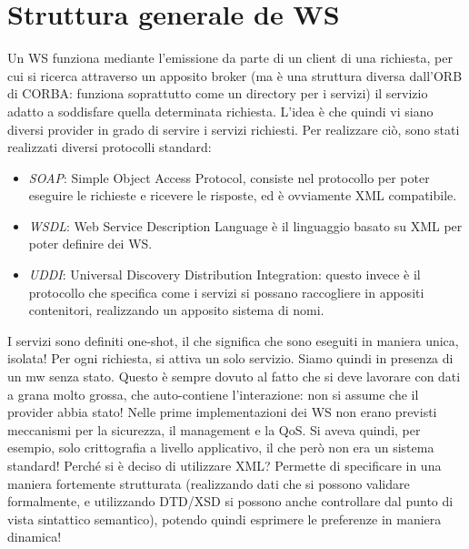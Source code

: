 \section{Struttura generale de WS}
Un WS funziona mediante l'emissione da parte di un client di una richiesta, per cui si ricerca attraverso un apposito
broker (ma è una struttura diversa dall'ORB di CORBA: funziona soprattutto come un directory per i servizi) il
servizio adatto a soddisfare quella determinata richiesta.
L'idea è che quindi vi siano diversi provider in grado di servire i servizi richiesti. Per realizzare ciò, sono stati
realizzati diversi protocolli standard:
\begin{itemize}
 \item \textit{SOAP}: Simple Object Access Protocol, consiste nel protocollo per poter eseguire le richieste e ricevere
 le risposte, ed è ovviamente XML compatibile.
 \item \textit{WSDL}: Web Service Description Language è il linguaggio basato su XML per poter definire dei WS.
 \item \textit{UDDI}: Universal Discovery Distribution Integration: questo invece è il protocollo che specifica come i
 servizi si possano raccogliere in appositi contenitori, realizzando un apposito sistema di nomi.
\end{itemize}
I servizi sono definiti one-shot, il che significa che sono eseguiti in maniera unica, isolata! Per ogni richiesta, si
attiva un solo servizio. Siamo quindi in presenza di un mw senza stato. Questo è sempre dovuto al fatto che si deve
lavorare con dati a grana molto grossa, che auto-contiene l'interazione: non si assume che il provider abbia stato!
Nelle prime implementazioni dei WS non erano previsti meccanismi per la sicurezza, il management e la QoS. Si aveva
quindi, per esempio, solo crittografia a livello applicativo, il che però non era un sistema standard!
Perché si è deciso di utilizzare XML? Permette di specificare in una maniera fortemente strutturata (realizzando dati
che si possono validare formalmente, e utilizzando DTD/XSD si possono anche controllare dal punto di vista
sintattico semantico), potendo quindi esprimere le preferenze in maniera dinamica!
